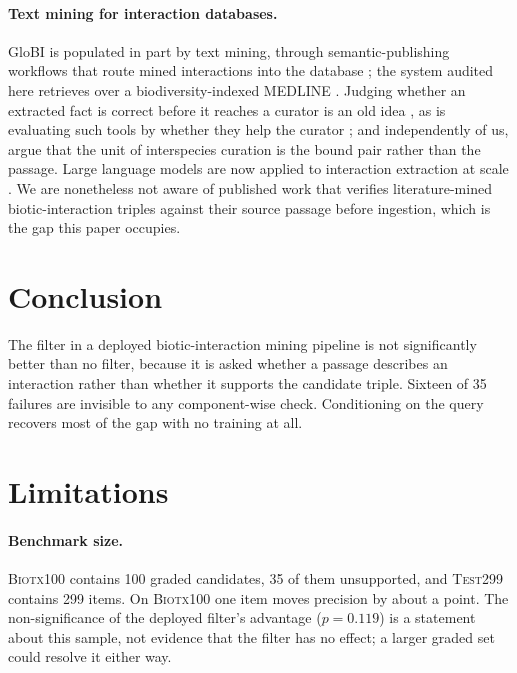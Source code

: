 \documentclass[11pt]{article}
\begin{document}
\paragraph{Text mining for interaction databases.}
GloBI \citep{poelen2014global} is populated in part by text mining, through semantic-publishing
workflows that route mined interactions into the database \citep{dimitrova2020semantic}; the
system audited here \citep{ruch2024biotxplorer} retrieves over a biodiversity-indexed MEDLINE
\citep{gobeill2020sibils}. Judging whether an extracted fact is correct before it reaches a
curator is an old idea \citep{rodriguezesteban2006imitating}, as is evaluating such tools by
whether they help the curator \citep{hirschman2012biocuration}; and independently of us, \citet{cuzick2023interspecies} argue that the unit of interspecies
curation is the bound pair rather than the passage. Large language models are now applied to
interaction extraction at scale \citep{keck2025extracting,farrell2024landscape}. We are
nonetheless not aware of published work that verifies literature-mined biotic-interaction
triples against their source passage before ingestion, which is the gap this paper occupies.

\section{Conclusion}
\label{sec:conclusion}
The filter in a deployed biotic-interaction mining pipeline is not significantly better than no
filter, because it is asked whether a passage describes an interaction rather than whether it
supports the candidate triple. Sixteen of 35 failures are invisible to any component-wise check.
Conditioning on the query recovers most of the gap with no training at all.

\section*{Limitations}

\paragraph{Benchmark size.} \textsc{Biotx100} contains 100 graded candidates, 35 of them
unsupported, and \textsc{Test299} contains 299 items. On \textsc{Biotx100} one item moves
precision by about a point. The non-significance of the deployed filter's advantage
($p = 0.119$) is a statement about this sample, not evidence that the filter has no effect; a
larger graded set could resolve it either way.
\end{document}
